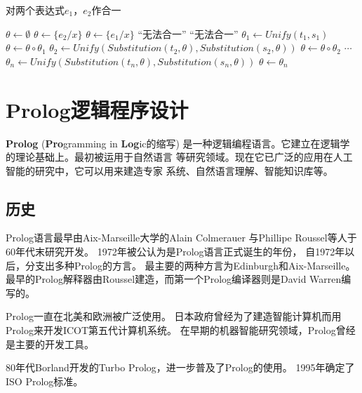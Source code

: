 \begin{algorithm}[H]
  \caption{对两个表达式$e_1$，$e_2$作合一}
  \label{algo:Unify}
  \begin{algorithmic}[1]
    \State $\theta\gets\emptyset$
    \State $\theta\gets \{e_2/x\}$
    \State $\theta\gets\{e_1/x\}$
    \State\Return ``无法合一''
    \Else
    \EndIf
    \State\Return ``无法合一''
    \Else
    \State $\theta_1 \gets Unify(t_1, s_1)$
    \State $\theta \gets \theta \circ \theta_1$
    \State $\theta_2 \gets Unify(Substitution(t_2, \theta), %
    Substitution(s_2,\theta))$
    \State $\theta \gets \theta \circ \theta_2$
    \State $\cdots$
    \State $\theta_n \gets Unify(Substitution(t_n, \theta), %
    Substitution(s_n, \theta))$
    \State $\theta \gets \theta_n$
    \State{}
    \EndIf
    \EndFunction
  \end{algorithmic}
\end{algorithm}


\section{Prolog逻辑程序设计}
\textbf{Prolog} ({\bfseries Pro}gramming in {\bfseries Log}ic的缩写)
是一种逻辑编程语言。它建立在逻辑学的理论基础上。最初被运用于自然语言
等研究领域。现在它已广泛的应用在人工智能的研究中，它可以用来建造专家
系统、自然语言理解、智能知识库等。

\subsection*{历史}
Prolog语言最早由Aix-Marseille大学的Alain Colmerauer
与Phillipe Roussel等人于60年代末研究开发。
1972年被公认为是Prolog语言正式诞生的年份，
自1972年以后，分支出多种Prolog的方言。
最主要的两种方言为Edinburgh和Aix-Marseille。
最早的Prolog解释器由Roussel建造，而第一个Prolog编译器则是David Warren编写的。

Prolog一直在北美和欧洲被广泛使用。
日本政府曾经为了建造智能计算机而用Prolog来开发ICOT第五代计算机系统。
在早期的机器智能研究领域，Prolog曾经是主要的开发工具。

80年代Borland开发的Turbo Prolog，进一步普及了Prolog的使用。
1995年确定了ISO Prolog标准。

